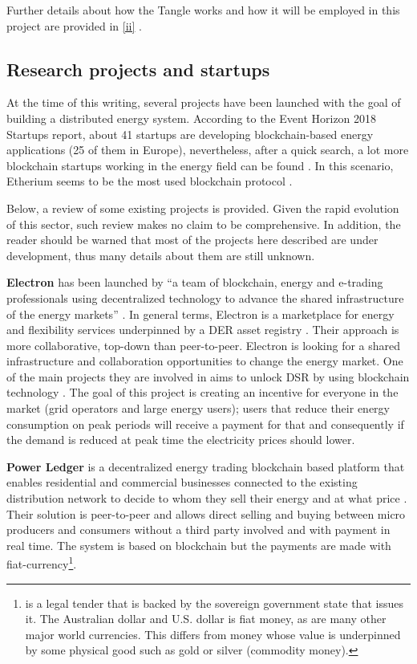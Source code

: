 Further details about how the Tangle works and how it will be employed in this project are provided in \ref{ii} . 


\subsection{Research projects and startups}
\label{rps}


At the time of this writing, several projects have been launched with the goal of building a distributed energy system. According to the Event Horizon 2018 Startups report, about 41 startups are developing blockchain-based energy applications (25 of them in Europe), nevertheless, after a quick search, a lot more blockchain startups working in the energy field can be found \cite{EnergyBlockchainStartups}. In this scenario, Etherium seems to be the most used blockchain protocol \cite{STARTUPSWHOISWHO}.



Below, a review of some existing projects is provided. Given the rapid evolution of this sector, such review makes no claim to be comprehensive. In addition, the reader should be warned that most of the projects here described are under development, thus many details about them are still unknown. 



\textbf{Electron} has been launched by “a team of blockchain, energy and e-trading professionals using decentralized technology to advance the shared infrastructure of the energy markets” \cite{Electron}. In general terms, Electron is a marketplace for energy and flexibility services underpinned by a \ac{DER} asset registry \cite{STARTUPSWHOISWHO}.
Their approach is more collaborative, top-down than peer-to-peer. Electron is looking for a shared infrastructure and collaboration opportunities to change the energy market. One of the main projects they are involved in aims to unlock \ac{DSR} by using blockchain technology \cite{demand-sideresponse}. The goal of this project is creating an incentive for everyone in the market (grid operators and large energy users); users that reduce their energy consumption on peak periods will receive a payment for that and consequently if the demand is reduced at peak time the electricity prices should lower.



\textbf{Power Ledger} is a decentralized energy trading blockchain based platform that enables residential and commercial businesses connected to the existing distribution network to decide to whom they sell their energy and at what price \cite{STARTUPSWHOISWHO}. Their solution is peer-to-peer and allows direct selling and buying between micro producers and consumers without a third party involved and with payment in real time. The system is based on blockchain but the payments are made with fiat-currency\footnote{is a legal tender that is backed by the sovereign government state that issues it. The
Australian dollar and U.S. dollar is fiat money, as are many other major world currencies. This differs
from money whose value is underpinned by some physical good such as gold or silver (commodity
money).}.



